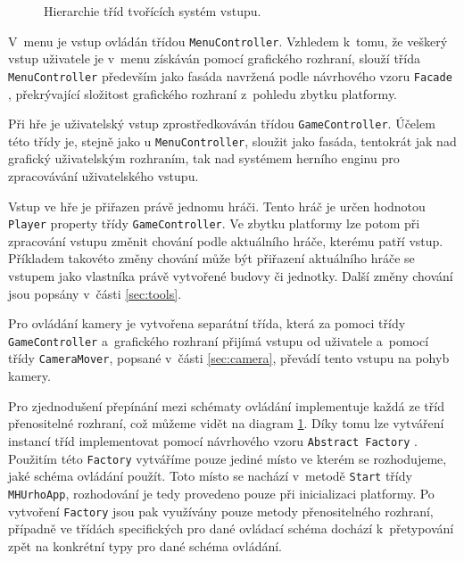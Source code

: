 \begin{figure}[h]
	\centering
	\fontsize{7pt}{10pt}\selectfont
	\def\svgwidth{\textwidth}
	
	\caption{Hierarchie tříd tvořících systém vstupu.}
	\label{fig:inputhier}
\end{figure}


V~menu je vstup ovládán třídou \texttt{MenuController}. Vzhledem k~tomu, že veškerý vstup uživatele je v~menu získáván pomocí grafického rozhraní, slouží třída \texttt{MenuController} především jako fasáda navržená podle návrhového vzoru \texttt{Facade} \citep[str.~185]{book:gangoffour}, překrývající složitost grafického rozhraní z~pohledu zbytku platformy. 

Při hře je uživatelský vstup zprostředkováván třídou \texttt{GameController}. Účelem této třídy je, stejně jako u \texttt{MenuController}, sloužit jako fasáda, tentokrát jak nad grafický uživatelským rozhraním, tak nad systémem herního enginu pro zpracovávání uživatelského vstupu. 

Vstup ve hře je přiřazen právě jednomu hráči. Tento hráč je určen hodnotou \texttt{Player} property třídy \texttt{GameController}. Ve zbytku platformy lze potom při zpracování vstupu změnit chování podle aktuálního hráče, kterému patří vstup. Příkladem takovéto změny chování může být přiřazení aktuálního hráče se vstupem jako vlastníka právě vytvořené budovy či jednotky. Další změny chování jsou popsány v~části \ref{sec:tools}.

Pro ovládání kamery je vytvořena separátní třída, která za pomoci třídy \texttt{GameController} a~grafického rozhraní přijímá vstupu od uživatele a~pomocí třídy \texttt{CameraMover},  popsané v~části \ref{sec:camera}, převádí tento vstupu na pohyb kamery.

Pro zjednodušení přepínání mezi schématy ovládání implementuje každá ze tříd přenositelné rozhraní, což můžeme vidět na diagram \ref{fig:inputhier}. Díky tomu lze vytváření instancí tříd implementovat pomocí návrhového vzoru \texttt{Abstract Factory} \citep[str.~87]{book:gangoffour}. Použitím této \texttt{Factory} vytváříme pouze jediné místo ve kterém se rozhodujeme, jaké schéma ovládání použít. Toto místo se nachází v~metodě \texttt{Start} třídy \texttt{MHUrhoApp}, rozhodování je tedy provedeno pouze při inicializaci platformy. Po vytvoření \texttt{Factory} jsou pak využívány pouze metody přenositelného rozhraní, případně ve třídách specifických pro dané ovládací schéma dochází k~přetypování zpět na konkrétní typy pro dané schéma ovládání.

